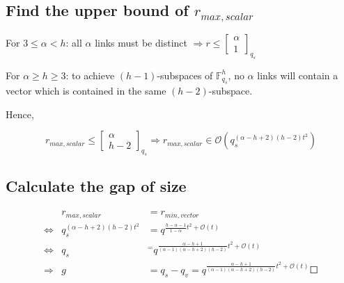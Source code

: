 \subsection{Find the upper bound of $r_{max,scalar}$}

\noindent{}

For $3\leq\alpha<h$: all $\alpha$ links must be distinct $\Rightarrow r\leq\left[\begin{array}{c}
\alpha\\
1
\end{array}\right]_{q_{s}}$

For $\alpha\geq h\geq3$: to achieve $(h-1)$-subspaces of $\ensuremath{\mathbb{F}}_{q_{s}}^{h}$,
no $\alpha$ links will contain a vector which is contained in the
same $(h-2)$-subspace.

Hence,

\[
r_{max,scalar}\leq\left[\begin{array}{c}
\alpha\\
h-2
\end{array}\right]_{q_{s}}\Rightarrow r_{max,scalar}\in\mathcal{O}\left(q_{s}^{\left(\alpha-h+2\right)\left(h-2\right)t^{2}}\right)
\]


\subsection{Calculate the gap of size}

\begin{eqnarray*}
 & r_{max,scalar} & =r_{min,vector}\\
\Leftrightarrow & q_{s}^{\left(\alpha-h+2\right)\left(h-2\right)t^{2}} & =q^{\frac{h-\alpha-1}{1-\alpha}t^{2}+\mathcal{O}(t)}\\
\Leftrightarrow & q_{s} & ^{=}q^{\frac{\alpha-h+1}{\left(\alpha-1\right)\left(\alpha-h+2\right)\left(h-2\right)}t^{2}+\mathcal{O}(t)}\\
\Rightarrow & g & =q_{s}-q_{v}=q^{\frac{\alpha-h+1}{\left(\alpha-1\right)\left(\alpha-h+2\right)\left(h-2\right)}t^{2}+\mathcal{O}(t)}\Square
\end{eqnarray*}

\clearpage